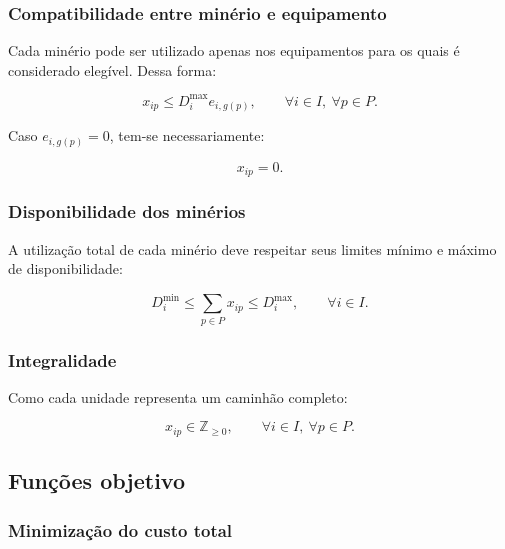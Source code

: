 \documentclass[12pt,a4paper]{article}
\begin{document}
\subsubsection{Compatibilidade entre minério e equipamento}

Cada minério pode ser utilizado apenas nos equipamentos para os quais
é considerado elegível. Dessa forma:

\begin{equation}
\boxed{
x_{ip}
\leq
D_i^{\max}e_{i,g(p)},
\qquad
\forall i\in I,\ \forall p\in P.
}
\end{equation}

Caso $e_{i,g(p)}=0$, tem-se necessariamente:

\begin{equation}
    x_{ip}=0.
\end{equation}


\subsubsection{Disponibilidade dos minérios}

A utilização total de cada minério deve respeitar seus limites mínimo
e máximo de disponibilidade:

\begin{equation}
\boxed{
D_i^{\min}
\leq
\sum_{p\in P}x_{ip}
\leq
D_i^{\max},
\qquad
\forall i\in I.
}
\end{equation}


\subsubsection{Integralidade}

Como cada unidade representa um caminhão completo:

\begin{equation}
\boxed{
x_{ip}\in\mathbb{Z}_{\geq0},
\qquad
\forall i\in I,\ \forall p\in P.
}
\end{equation}



\subsection{Funções objetivo}

\subsubsection{Minimização do custo total}
\end{document}
